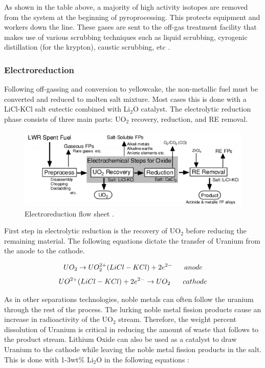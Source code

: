 As shown in the table above, a majority of high activity isotopes are removed from the system at the beginning of pyroprocessing. This protects equipment and workers down the line. These gases are sent to the off-gas treatment facility that makes use of various scrubbing techniques such as liquid scrubbing, cyrogenic distillation (for the krypton), caustic scrubbing, etc \cite{jubin_spent_2009}.

\subsubsection{Electroreduction}
Following off-gassing and conversion to yellowcake, the non-metallic fuel must be converted and reduced to molten salt mixture. Most cases this is done with a LiCl-KCl salt eutectic combined with Li$_2$O catalyst. The electrolytic reduction phase consists of three main parts: UO$_2$ recovery, reduction, and RE removal.

\begin{figure}[h]
	\centering
	\includegraphics[width=\linewidth]{images/reduction_flow}
	\caption{Electroreduction flow sheet \cite{ohta}.}
\end{figure}

First step in electrolytic reduction is the recovery of UO$_2$ before reducing the remaining material.
The following equations dictate the transfer of Uranium from the anode to the cathode.

\[ UO_2 \rightarrow UO_2^{2+}(LiCl-KCl) + 2e^{2-} \hspace{6mm} anode \]
\[ UO^{2+}(LiCl-KCl) + 2e^{2-} \rightarrow UO_2 \hspace{6mm} cathode \]

As in other separations technologies, noble metals can often follow the uranium through the rest of the process.
The lurking noble metal fission products cause an increase in radioactivity of the UO$_2$ stream. 
Therefore, the weight percent dissolution of Uranium is critical in reducing the amount of waste that follows to the product stream.
Lithium Oxide can also be used as a catalyst to draw Uranium to the cathode while leaving the noble metal fission products in the salt.
This is done with 1-3wt\% Li$_2$O in the following equations \cite{hur_electrochemical_nodate}:

